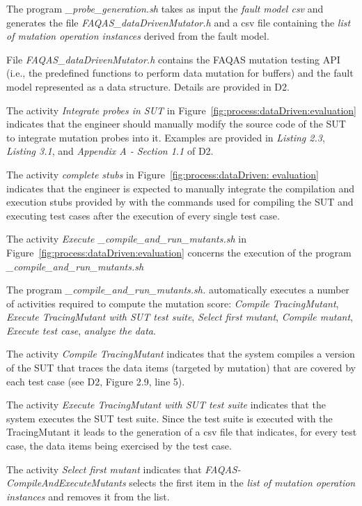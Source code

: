 The program \emph{\dama\_probe\_generation.sh} takes as input the \emph{fault model csv} and generates the file \emph{FAQAS\_dataDrivenMutator.h} and a csv file containing the \emph{list of mutation operation instances} derived from the fault model.

File \emph{FAQAS\_dataDrivenMutator.h} contains the FAQAS mutation testing API (i.e., the predefined functions to perform data mutation for buffers) and the fault model represented as a data structure. Details are provided in D2.

The activity \emph{Integrate probes in SUT} in Figure~\ref{fig:process:dataDriven:evaluation} indicates that the engineer should manually modify the source code of the SUT to integrate mutation probes into it. Examples are provided in \emph{Listing 2.3}, \emph{Listing 3.1}, and \emph{Appendix A - Section 1.1} of D2.

The activity \emph{complete \dama stubs} in Figure~\ref{fig:process:dataDriven: evaluation} indicates that the engineer is expected to manually integrate the compilation and execution stubs provided by \dama with the commands used for compiling the SUT and  executing test cases after the execution of every single test case.

The activity \emph{Execute \dama\_compile\_and\_run\_mutants.sh} in Figure~\ref{fig:process:dataDriven:evaluation} concerns the execution of the program \emph{\dama\_compile\_and\_run\_mutants.sh}

The program \emph{\dama\_compile\_and\_run\_mutants.sh.} automatically executes a number of activities required to compute the mutation score: \emph{Compile TracingMutant}, \emph{Execute TracingMutant with SUT test suite}, \emph{Select first mutant}, \emph{Compile mutant}, \emph{Execute test case},  \emph{analyze the data}.

The activity \emph{Compile TracingMutant} indicates that the system compiles a version of the SUT that traces the data items (targeted by mutation) that are covered by each test case (see D2, Figure 2.9, line 5).

The activity \emph{Execute TracingMutant with SUT test suite} indicates that the system executes the SUT test suite. Since the test suite is executed with the TracingMutant it leads to the generation of a csv file that indicates, for every test case, the data items being exercised by the test case.

The activity \emph{Select first mutant} indicates that  \emph{FAQAS-CompileAndExecuteMutants} selects the first item in the \emph{list of mutation operation instances} and removes it from the list.

